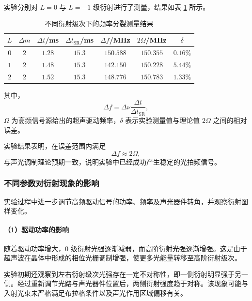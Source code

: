 \documentclass[a4paper]{ctexart}
\begin{document}
实验分别对 $L=0$ 与 $L=-1$ 级衍射进行了测量，结果如表 \ref{tab:diffraction_modes} 所示。

\begin{table}[h!]
    \centering
    \begin{tabular}{ccccccc}
        \toprule
        $L$ & $\Delta m$ & $\Delta t$/ms & $\Delta t_{\mathrm{SR}}$/ms &
        $\Delta f$/MHz & $2\Omega$/MHz & $\delta$ \\
        \midrule
        $0$ & $2$ & $1.28$ & $15.3$ &
        $150.588$ & $150.355$ & $0.16\%$ \\
        
        $1$ & $2$ & $1.48$ & $15.3$ &
        $142.150$ & $150.228$ & $5.44\%$ \\
        
        $2$ & $2$ & $1.52$ & $15.3$ &
        $148.776$ & $150.783$ & $1.33\%$ \\
        \bottomrule
    \end{tabular}
    \caption{不同衍射级次下的频率分裂测量结果}
    \label{tab:diffraction_modes}
\end{table}

其中，
\begin{equation}
    \Delta f
    =
    \Delta \nu
    \frac{\Delta t}{\Delta t_{\mathrm{SR}}},
\end{equation}
$\Omega$ 为高频信号源给出的超声驱动频率，$\delta$ 表示实验测量值与理论值 $2\Omega$ 之间的相对误差。

实验结果表明，在误差范围内满足
\[
\Delta f \approx 2\Omega,
\]
与声光调制理论预期一致，说明实验中已经成功产生稳定的光拍频信号。


\subsubsection{不同参数对衍射现象的影响}

实验过程中进一步调节高频驱动信号的功率、频率及声光器件转角，并观察衍射图样变化。

\vspace{0.5em}

\paragraph{（1）驱动功率的影响}

随着驱动功率增大，$0$ 级衍射光强逐渐减弱，而高阶衍射光强逐渐增强。这是由于超声波在晶体中形成的相位光栅调制增强，使更多光能量转移至高阶衍射级次。

实验初期还观察到左右衍射级次光强存在一定不对称性，即一侧衍射明显强于另一侧。经过重新调节光路与声光器件位置后，两侧衍射强度趋于对称。该现象可能与入射光束未严格满足布拉格条件以及声光作用区域偏移有关。
\end{document}
